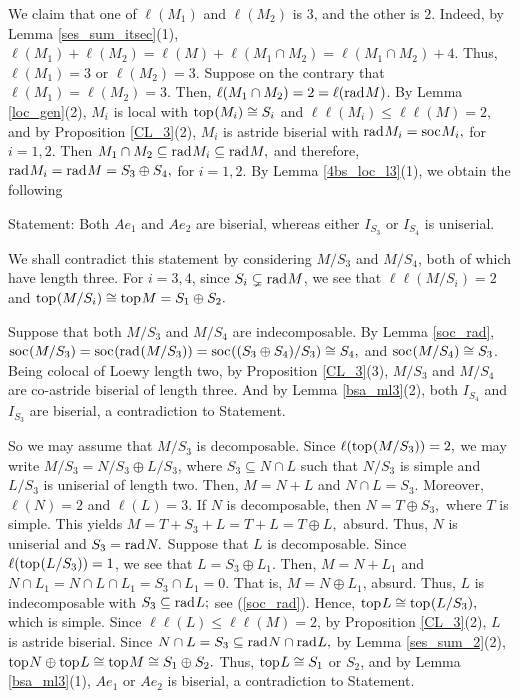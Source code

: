 \documentclass[10pt]{amsart}
\theoremstyle{definition}
\newcommand{\rad}{{\rm rad}\hspace{.5pt}}
\newcommand{\soc}{{\rm soc}\hspace{.5pt}}
\newcommand{\ntop}{{\rm top}\hspace{.5pt}}
\begin{document}
We claim that one of $\ell(M_1)$ and $\ell(M_2)$ is $3$, and the other is $2$. Indeed, by Lemma \ref{ses_sum_itsec}(1), $\ell(M_1)+\ell(M_2)=\ell(M)+\ell(M_1\cap M_2)=\ell(M_1\cap M_2)+4$. Thus, $\ell(M_1)=3$ or $\ell(M_2)=3.$ Suppose on the contrary that $\ell(M_1)=\ell(M_2)=3.$ Then, $\ell(M_1\cap M_2)=2=\ell(\rad M)$. By Lemma \ref{loc_gen}(2), $M_i$ is local with $\ntop(M_i)\cong S_i$ and $\ell\ell(M_i)\le \ell\ell(M)=2,$ and by Proposition \ref{CL_3}(2), $M_i$ is astride biserial with $\rad M_i=\soc M_i,$ for $i=1, 2$. Then $M_1\cap M_2\subseteq \rad M_i\subseteq \rad M,$ and therefore, $\rad M_i=\rad M=S_3 \oplus S_4,$ for $i=1, 2$. By Lemma \ref{4bs_loc_l3}(1), we obtain the following 

Statement: Both $Ae_1$ and $Ae_2$ are biserial, whereas either $I_{S_3}$ or $I_{S_4}$ is uniserial.

We shall contradict this statement by considering $M/S_3$ and $M/S_4$, both of which have length three. For $i=3, 4$, since $S_i\subsetneq \rad M$, we see that $\ell\ell(M/S_i)=2$ and $\ntop(M/S_i)\cong \ntop M=S_1\oplus S_2.$ 

Suppose that both $M/S_3$ and $M/S_4$ are indecomposable. By Lemma \ref{soc_rad}, $\soc(M/S_3)=\soc(\rad(M/S_3))=\soc((S_3\oplus S_4)/S_3)\cong S_4,$ and $\soc(M/S_4)\cong S_3$. Being colocal of Loewy length two, by Proposition \ref{CL_3}(3), $M/S_3$ and $M/S_4$ are co-astride biserial of length three. And by Lemma \ref{bsa_ml3}(2), both $I_{S_4}$ and $I_{S_3}$ are biserial, a contradiction to Statement. 

So we may assume that $M/S_3$ is decomposable. Since $\ell(\ntop(M/S_3))=2,$ we may write $M/S_3=N/S_3 \oplus L/S_3$, where $S_3\subseteq N \cap L$ such that $N/S_3$ is simple and $L/S_3$ is uniserial of length two. Then, $M=N+L$ and $N\cap L=S_3.$ Moreover, $\ell(N)=2$ and $\ell(L)=3$. If $N$ is decomposable, then $N=T\oplus S_3,$ where $T$ is simple. This yields $M=T+S_3+L=T+L=T\oplus L,$ absurd. Thus, $N$ is uniserial and $S_3=\rad N.$ Suppose that $L$ is decomposable. Since $\ell(\ntop(L/S_3))=1$, we see that $L=S_3\oplus L_1$. Then, $M=N+L_1$ and $N\cap L_1=N\cap L\cap L_1=S_3\cap L_1=0$. That is, $M=N\oplus L_1$, absurd. Thus, $L$ is indecomposable with $S_3\subseteq \rad L;$ see (\ref{soc_rad}). Hence, $\ntop L\cong \ntop(L/S_3),$ which is simple. Since $\ell\ell(L)\le \ell\ell(M)=2$, by Proposition \ref{CL_3}(2), $L$ is astride biserial. Since $N\cap L= S_3\subseteq \rad N \cap \rad L,$ by Lemma \ref{ses_sum_2}(2), $\ntop N\oplus \ntop L\cong \ntop M\cong S_1\oplus S_2.$ Thus, $\ntop L\cong S_1$ or $S_2$, and by Lemma \ref{bsa_ml3}(1), $Ae_1$ or $Ae_2$ is biserial, a contradiction to Statement. 
\end{document}
